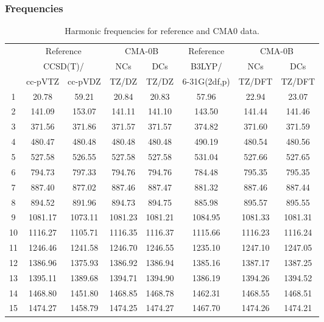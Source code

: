 \documentclass[10pt,oneside]{article}
\begin{document}
\subsubsection*{Frequencies}
\begin{table}[h!]
\centering
\caption{Harmonic frequencies for reference and CMA0 data.}
\begin{tabular}{cccccccc}
\toprule
{} & \multicolumn{2}{c}{Reference} & \multicolumn{2}{c}{CMA-0B} &    Reference & \multicolumn{2}{c}{CMA-0B} \\
{} & \multicolumn{2}{c}{CCSD(T)/} &     NCs &     DCs &       B3LYP/ &     NCs &     DCs \\
{} &   cc-pVTZ & cc-pVDZ &   TZ/DZ &   TZ/DZ & 6-31G(2df,p) &  TZ/DFT &  TZ/DFT \\
\midrule
1  &     20.78 &   59.21 &   20.84 &   20.83 &        57.96 &   22.94 &   23.07 \\
2  &    141.09 &  153.07 &  141.11 &  141.10 &       143.50 &  141.44 &  141.46 \\
3  &    371.56 &  371.86 &  371.57 &  371.57 &       374.82 &  371.60 &  371.59 \\
4  &    480.47 &  480.48 &  480.48 &  480.48 &       490.19 &  480.54 &  480.56 \\
5  &    527.58 &  526.55 &  527.58 &  527.58 &       531.04 &  527.66 &  527.65 \\
6  &    794.73 &  797.33 &  794.76 &  794.76 &       784.48 &  795.35 &  795.35 \\
7  &    887.40 &  877.02 &  887.46 &  887.47 &       881.32 &  887.46 &  887.44 \\
8  &    894.52 &  891.96 &  894.73 &  894.75 &       885.98 &  895.57 &  895.55 \\
9  &   1081.17 & 1073.11 & 1081.23 & 1081.21 &      1084.95 & 1081.33 & 1081.31 \\
10 &   1116.27 & 1105.71 & 1116.35 & 1116.37 &      1115.66 & 1116.23 & 1116.24 \\
11 &   1246.46 & 1241.58 & 1246.70 & 1246.55 &      1235.10 & 1247.10 & 1247.05 \\
12 &   1386.96 & 1375.93 & 1386.92 & 1386.94 &      1385.16 & 1387.17 & 1387.25 \\
13 &   1395.11 & 1389.68 & 1394.71 & 1394.90 &      1386.19 & 1394.26 & 1394.52 \\
14 &   1468.80 & 1451.80 & 1468.85 & 1468.78 &      1462.31 & 1468.55 & 1468.51 \\
15 &   1474.27 & 1458.79 & 1474.25 & 1474.27 &      1467.70 & 1474.26 & 1474.21 \\

\end{tabular}
\end{table}
\end{document}
